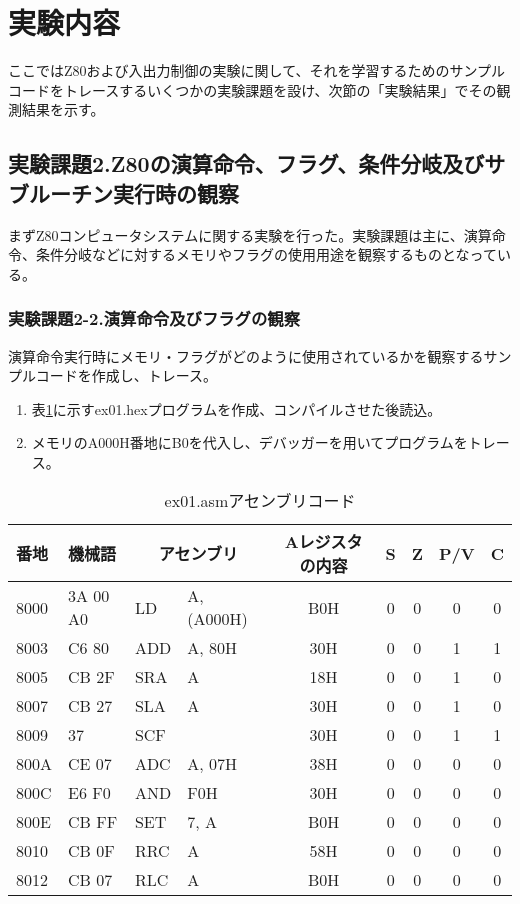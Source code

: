 \documentclass[11pt,a4j]{jsarticle}
\begin{document}
  
 \section{実験内容}
  ここではZ80および入出力制御の実験に関して、それを学習するためのサンプルコードをトレースするいくつかの実験課題を設け、次節の「実験結果」でその観測結果を示す。
  \subsection{実験課題2.Z80の演算命令、フラグ、条件分岐及びサブルーチン実行時の観察}
  まずZ80コンピュータシステムに関する実験を行った。実験課題は主に、演算命令、条件分岐などに対するメモリやフラグの使用用途を観察するものとなっている。

   \subsubsection{実験課題2-2.演算命令及びフラグの観察}
   演算命令実行時にメモリ・フラグがどのように使用されているかを観察するサンプルコードを作成し、トレース。
   \begin{enumerate}
   \item 表\ref{tab:tejun2-2}に示すex01.hexプログラムを作成、コンパイルさせた後読込。
   \item メモリのA000H番地にB0を代入し、デバッガーを用いてプログラムをトレース。
   \end{enumerate}
   
   
   \begin{table}[htb]
  \begin{center}
    \caption{ex01.asmアセンブリコード}
    \begin{tabular}{|l|l|ll|c|c|c|c|c|} \hline
番地 & 機械語 & \multicolumn{2}{|c|}{アセンブリ} & Aレジスタの内容 & S & Z & P/V & C \\ \hline
8000 & 3A 00 A0 & LD & A, (A000H) & B0H & 0 & 0 & 0 & 0 \\ \hline
8003 & C6 80 & ADD & A, 80H & 30H & 0 & 0 & 1 & 1 \\ \hline
8005 & CB 2F & SRA & A & 18H & 0 & 0 & 1 & 0 \\ \hline
8007 & CB 27 & SLA & A & 30H & 0 & 0 & 1 & 0 \\ \hline
8009 & 37 & SCF &  & 30H & 0 & 0 & 1 & 1 \\ \hline
800A & CE 07 & ADC & A, 07H & 38H & 0 & 0 & 0 & 0 \\ \hline
800C & E6 F0 & AND & F0H & 30H & 0 & 0 & 0 & 0 \\ \hline
800E & CB FF & SET & 7, A & B0H & 0 & 0 & 0 & 0 \\ \hline
8010 & CB 0F & RRC & A & 58H & 0 & 0 & 0 & 0 \\ \hline
8012 & CB 07 & RLC & A & B0H & 0 & 0 & 0 & 0 \\ \hline
    \end{tabular}
    \label{tab:tejun2-2}
  \end{center}
 \end{table}
   
\end{document}
